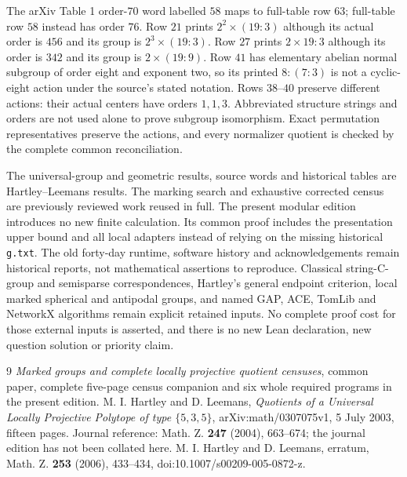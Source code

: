 \documentclass[11pt,a4paper]{article}
\begin{document}
The arXiv Table 1 order-$70$ word labelled $58$ maps to full-table row $63$; full-table row $58$ instead has order $76$. Row $21$ prints $2^2\times(19:3)$ although its actual order is $456$ and its group is $2^3\times(19:3)$. Row $27$ prints $2\times19:3$ although its order is $342$ and its group is $2\times(19:9)$. Row $41$ has elementary abelian normal subgroup of order eight and exponent two, so its printed $8:(7:3)$ is not a cyclic-eight action under the source's stated notation. Rows $38$--$40$ preserve different actions: their actual centers have orders $1,1,3$. Abbreviated structure strings and orders are not used alone to prove subgroup isomorphism. Exact permutation representatives preserve the actions, and every normalizer quotient is checked by the complete common reconciliation.

The universal-group and geometric results, source words and historical tables are Hartley--Leemans results. The marking search and exhaustive corrected census are previously reviewed work reused in full. The present modular edition introduces no new finite calculation. Its common proof includes the presentation upper bound and all local adapters instead of relying on the missing historical \texttt{g.txt}. The old forty-day runtime, software history and acknowledgements remain historical reports, not mathematical assertions to reproduce. Classical string-C-group and semisparse correspondences, Hartley's general endpoint criterion, local marked spherical and antipodal groups, and named GAP, ACE, TomLib and NetworkX algorithms remain explicit retained inputs. No complete proof cost for those external inputs is asserted, and there is no new Lean declaration, new question solution or priority claim.
\begin{thebibliography}{9}
 \emph{Marked groups and complete locally projective quotient censuses}, common paper, complete five-page census companion and six whole required programs in the present edition.
 M. I. Hartley and D. Leemans, \emph{Quotients of a Universal Locally Projective Polytope of type $\{5,3,5\}$}, arXiv:math/0307075v1, 5 July 2003, fifteen pages. Journal reference: Math. Z. \textbf{247} (2004), 663--674; the journal edition has not been collated here.
 M. I. Hartley and D. Leemans, erratum, Math. Z. \textbf{253} (2006), 433--434, doi:10.1007/s00209-005-0872-z.
\end{thebibliography}
\end{document}
